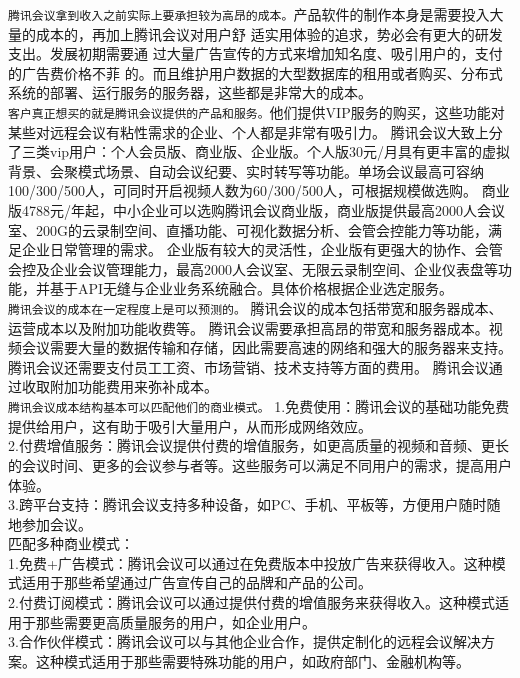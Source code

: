 \documentclass[a4paper,12pt]{article}
\begin{document}
\texttt{腾讯会议拿到收入之前实际上要承担较为高昂的成本。}产品软件的制作本身是需要投入大量的成本的，再加上腾讯会议对用户舒
适实用体验的追求，势必会有更大的研发支出。发展初期需要通
过大量广告宣传的方式来增加知名度、吸引用户的，支付的广告费价格不菲
的。而且维护用户数据的大型数据库的租用或者购买、分布式系统的部署、运行服务的服务器，这些都是非常大的成本。\\

\texttt{客户真正想买的就是腾讯会议提供的产品和服务。}他们提供VIP服务的购买，这些功能对某些对远程会议有粘性需求的企业、个人都是非常有吸引力。
腾讯会议大致上分了三类vip用户：个人会员版、商业版、企业版。个人版30元/月具有更丰富的虚拟背景、会聚模式场景、自动会议纪要、实时转写等功能。单场会议最高可容纳100/300/500人，可同时开启视频人数为60/300/500人，可根据规模做选购。
商业版4788元/年起，中小企业可以选购腾讯会议商业版，商业版提供最高2000人会议室、200G的云录制空间、直播功能、可视化数据分析、会管会控能力等功能，满足企业日常管理的需求。
企业版有较大的灵活性，企业版有更强大的协作、会管会控及企业会议管理能力，最高2000人会议室、无限云录制空间、企业仪表盘等功能，并基于API无缝与企业业务系统融合。具体价格根据企业选定服务。\\

\texttt{腾讯会议的成本在一定程度上是可以预测的。}
腾讯会议的成本包括带宽和服务器成本、运营成本以及附加功能收费等。
腾讯会议需要承担高昂的带宽和服务器成本。视频会议需要大量的数据传输和存储，因此需要高速的网络和强大的服务器来支持。
腾讯会议还需要支付员工工资、市场营销、技术支持等方面的费用。
腾讯会议通过收取附加功能费用来弥补成本。\\
\texttt{腾讯会议成本结构基本可以匹配他们的商业模式。}
1.免费使用：腾讯会议的基础功能免费提供给用户，这有助于吸引大量用户，从而形成网络效应。\\
2.付费增值服务：腾讯会议提供付费的增值服务，如更高质量的视频和音频、更长的会议时间、更多的会议参与者等。这些服务可以满足不同用户的需求，提高用户体验。\\
3.跨平台支持：腾讯会议支持多种设备，如PC、手机、平板等，方便用户随时随地参加会议。\\
匹配多种商业模式：\\
1.免费+广告模式：腾讯会议可以通过在免费版本中投放广告来获得收入。这种模式适用于那些希望通过广告宣传自己的品牌和产品的公司。\\
2.付费订阅模式：腾讯会议可以通过提供付费的增值服务来获得收入。这种模式适用于那些需要更高质量服务的用户，如企业用户。\\
3.合作伙伴模式：腾讯会议可以与其他企业合作，提供定制化的远程会议解决方案。这种模式适用于那些需要特殊功能的用户，如政府部门、金融机构等。\\
\end{document}

